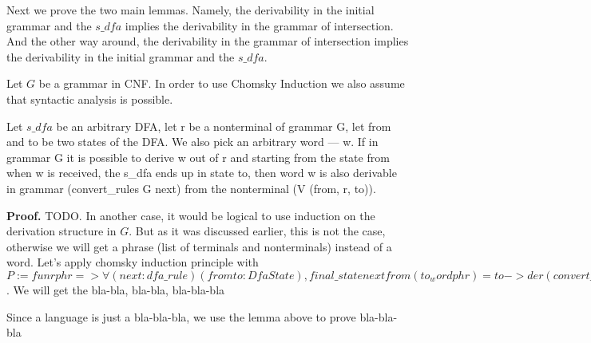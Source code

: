 Next we prove the two main lemmas. Namely, the derivability in the initial grammar and the $s\_dfa$ implies the derivability in the grammar of intersection. And the other way around, the derivability in the grammar of intersection implies the derivability in the initial grammar and the $s\_dfa$.

Let $G$ be a grammar in CNF. In order to use Chomsky Induction we also assume that syntactic analysis is possible. 

\begin{theorem}
	Let $s\_dfa$ be an arbitrary DFA, let r be a nonterminal of grammar G, let from and to be two states of the DFA. We also pick an arbitrary word --- w. If in grammar G it is possible to derive w out of r and starting from the state from when w is received, the s\_dfa ends up in state to, then word w is also derivable in grammar (convert\_rules G next) from the nonterminal (V (from, r, to)).
\end{theorem}

\textbf{Proof.}	TODO.
In another case, it would be logical to use induction on the derivation structure in $G$. But as it was discussed earlier, this is not the case, otherwise we will get a phrase (list of terminals and nonterminals) instead of a word. 
Let's apply chomsky induction principle with 
  $P := fun r phr => \forall (next : dfa\_rule) (from to : DfaState),
           final\_state next from (to_word phr) = to ->
            der (convert\_rules G next) (V (from, r, to)) phr$.
We will get the bla-bla, bla-bla, bla-bla-bla         



Since a language is just a bla-bla-bla, we use the lemma above to prove bla-bla-bla




